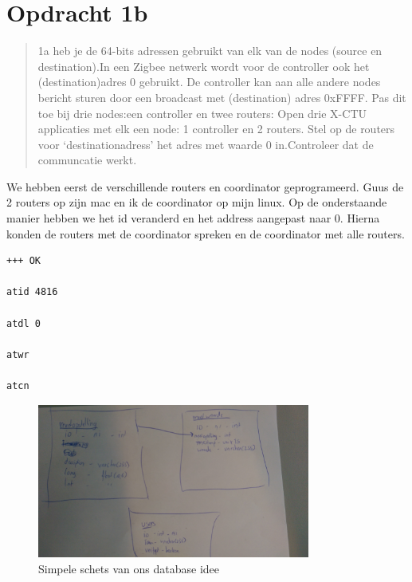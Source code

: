 \documentclass[12pt]{article}
\begin{document}
\section*{Opdracht 1b}
\begin{quote}
1a heb je de 64-bits adressen gebruikt van elk van de nodes (source en destination).In een Zigbee netwerk wordt voor de controller ook het (destination)adres 0 gebruikt.
De controller kan aan alle andere nodes bericht sturen door een broadcast met (destination) adres 0xFFFF. Pas dit toe bij drie nodes:een controller en twee routers: Open drie X-CTU applicaties met elk een node: 1 controller en 2 routers. Stel op de routers voor ‘destinationadress’ het adres met waarde 0 in.Controleer dat de communcatie werkt.
\end{quote}
We hebben eerst de verschillende routers en coordinator geprogrameerd. Guus de 2 routers op zijn mac en ik de coordinator op mijn linux. Op de onderstaande manier hebben we het id veranderd en het address aangepast naar 0. Hierna konden de routers met de coordinator spreken en de coordinator met alle routers.
\begin{lstlisting}
+++ OK

atid 4816

atdl 0

atwr

atcn
\end{lstlisting}	
\begin{figure}[h!]
  \centering
      \includegraphics[width=0.8\textwidth]{IMAG0013}
  \caption{Simpele schets van ons database idee}
\end{figure}
\newpage
\end{document}
